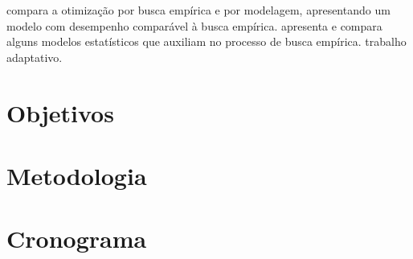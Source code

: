 \documentclass[a4paper, 11pt]{article}
\begin{document}
%
%


\citet{yotov2003} compara a otimização por busca empírica e por 
modelagem, apresentando um modelo com desempenho comparável à busca empírica.
\citet{vuduc2004} apresenta e compara alguns
modelos estatísticos que auxiliam no processo de busca empírica.
\citet{yu2004adaptive} trabalho adaptativo.

\section{Objetivos} \label{sec:obj}

\section{Metodologia} \label{sec:met}

\section{Cronograma} \label{sec:chrono}

\newpage


\end{document}
